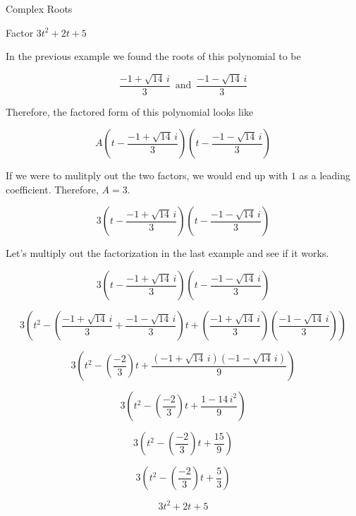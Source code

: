 \documentclass{ximera}
\begin{document}
\begin{example} Complex Roots

Factor $3 t^2 + 2 t + 5$


In the previous example we found the roots of this polynomial to be


\[     \frac{-1 + \sqrt{14} \, i}{3}   \,  \text{ and } \, \frac{-1 - \sqrt{14} \, i}{3}         \]

Therefore, the factored form of this polynomial looks like


\[     A \left(t - \frac{-1 + \sqrt{14} \, i}{3} \right) \left(t -  \frac{-1 - \sqrt{14} \, i}{3} \right)        \]


If we were to mulitply out the two factors, we would end up with $1$ as a leading coefficient.  Therefore, $A = 3$.

\[     3 \left(t - \frac{-1 + \sqrt{14} \, i}{3} \right) \left(t -  \frac{-1 - \sqrt{14} \, i}{3} \right)        \]

\end{example}





Let's multiply out the factorization in the last example and see if it works.



\[     3 \left(t - \frac{-1 + \sqrt{14} \, i}{3} \right) \left(t -  \frac{-1 - \sqrt{14} \, i}{3} \right)        \]


\[     3 \left(  t^2 - \left(\frac{-1 + \sqrt{14} \, i}{3} + \frac{-1 - \sqrt{14} \, i}{3}\right) t + \left(\frac{-1 + \sqrt{14} \, i}{3}\right) \left(\frac{-1 - \sqrt{14} \, i}{3}\right)      \right)       \]



\[     3 \left(  t^2 - \left(\frac{-2}{3} \right) t + \frac{(-1 + \sqrt{14} \, i)(-1 - \sqrt{14} \, i)}{9}\right)     \]



\[     3 \left(  t^2 - \left(\frac{-2}{3} \right) t + \frac{1 - 14 \, i^2}{9}\right)     \]


\[     3 \left(  t^2 - \left(\frac{-2}{3} \right) t + \frac{15}{9} \right)     \]


\[     3 \left(  t^2 - \left(\frac{-2}{3} \right) t + \frac{5}{3}\right)     \]



\[      3 t^2 + 2 t + 5   \]
\end{document}
